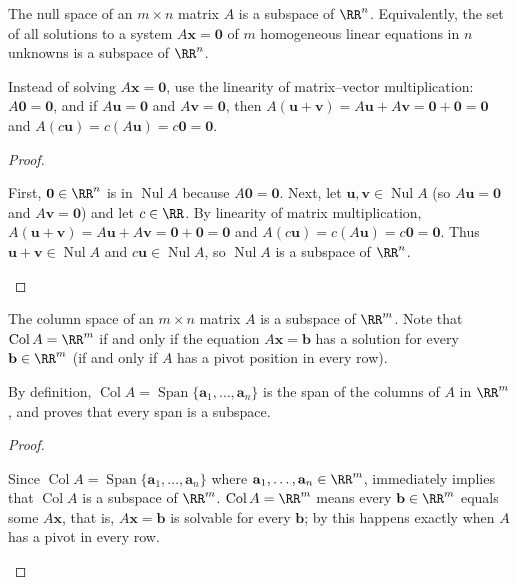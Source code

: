 \documentclass[10pt]{scrartcl}
\newcommand{\vv}[1]{\mathbf{#1}}
\DeclareMathOperator{\spn}{Span}\DeclareMathOperator{\Nul}{Nul}\DeclareMathOperator{\Col}{Col}\DeclareMathOperator{\Row}{Row}\DeclareMathOperator{\adj}{adj}
\begin{document}
\begin{theorem*}
  The null space of an $m\times n$ matrix $A$ is a subspace of $\RR^n$. Equivalently, the set of all solutions to a system $A\vv x=\vv 0$ of $m$ homogeneous linear equations in $n$ unknowns is a subspace of $\RR^n$.
\end{theorem*}
\begin{ideabox}
  Instead of solving $A\vv x=\vv 0$, use the linearity of matrix--vector multiplication: $A\vv 0=\vv 0$, and if $A\vv u=\vv 0$ and $A\vv v=\vv 0$, then $A(\vv u+\vv v)=A\vv u+A\vv v=\vv 0+\vv 0=\vv 0$ and $A(c\vv u)=c(A\vv u)=c\vv 0=\vv 0$.
\end{ideabox}
\begin{proof}
  \begin{steps}
    \ii First, $\vv 0\in\RR^n$ is in $\Nul A$ because $A\vv 0=\vv 0$.
    \ii Next, let $\vv u,\vv v\in\Nul A$ (so $A\vv u=\vv 0$ and $A\vv v=\vv 0$) and let $c\in\RR$. By linearity of matrix multiplication, $A(\vv u+\vv v)=A\vv u+A\vv v=\vv 0+\vv 0=\vv 0$ and $A(c\vv u)=c(A\vv u)=c\vv 0=\vv 0$. Thus $\vv u+\vv v\in\Nul A$ and $c\vv u\in\Nul A$, so $\Nul A$ is a subspace of $\RR^n$.
  \end{steps}
\end{proof}

\begin{theorem*}
  The column space of an $m\times n$ matrix $A$ is a subspace of $\RR^m$. Note that $\Col A=\RR^m$ if and only if the equation $A\vv x=\vv b$ has a solution for every $\vv b\in\RR^m$ (if and only if $A$ has a pivot position in every row).
\end{theorem*}
\begin{ideabox}
  By definition, $\Col A=\spn\{\vv a_1,\dots,\vv a_n\}$ is the span of the columns of $A$ in $\RR^m$, and  proves that every span is a subspace.
\end{ideabox}
\begin{proof}
  \begin{steps}
    \ii Since $\Col A=\spn\{\vv a_1,\dots,\vv a_n\}$ where $\vv a_1,\dots,\vv a_n\in\RR^m$,  immediately implies that $\Col A$ is a subspace of $\RR^m$.
    \ii $\Col A=\RR^m$ means every $\vv b\in\RR^m$ equals some $A\vv x$, that is, $A\vv x=\vv b$ is solvable for every $\vv b$; by  this happens exactly when $A$ has a pivot in every row.
  \end{steps}
\end{proof}
\end{document}
